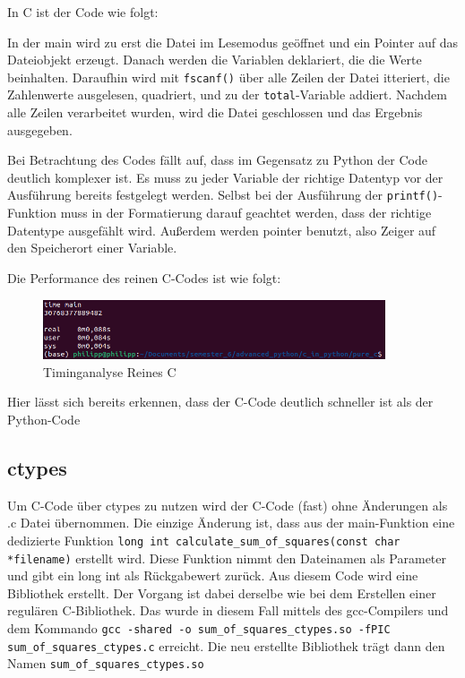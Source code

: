 \documentclass[a4paper, parskip=half]{scrartcl}
\begin{document}
In C ist der Code wie folgt:



In der main wird zu erst die Datei im Lesemodus geöffnet und ein Pointer auf das Dateiobjekt erzeugt. Danach werden die Variablen deklariert, die die Werte beinhalten. Daraufhin wird mit \lstinline{fscanf()} über alle Zeilen der Datei itteriert, die Zahlenwerte ausgelesen, quadriert, und zu der \lstinline{total}-Variable addiert. 
Nachdem alle Zeilen verarbeitet wurden, wird die Datei geschlossen und das Ergebnis ausgegeben. 

Bei Betrachtung des Codes fällt auf, dass im Gegensatz zu Python der Code deutlich komplexer ist. Es muss zu jeder Variable der richtige Datentyp vor der Ausführung bereits festgelegt werden. Selbst bei der Ausführung der \lstinline{printf()}-Funktion muss in der Formatierung darauf geachtet werden, dass der richtige Datentype ausgefählt wird. Außerdem werden pointer benutzt, also Zeiger auf den Speicherort einer Variable. 

Die Performance des reinen C-Codes ist wie folgt:
\begin{figure}[H]
    \centering
    \includegraphics[width=0.9\textwidth]{pure_c/timing_c.png}
    \caption{Timinganalyse Reines C}
    \label{fig:timing-pure-c}
\end{figure}

Hier lässt sich bereits erkennen, dass der C-Code deutlich schneller ist als der Python-Code

\subsection{ctypes}

Um C-Code über ctypes zu nutzen wird der C-Code (fast) ohne Änderungen als .c Datei übernommen. Die einzige Änderung ist, dass aus der main-Funktion eine dedizierte Funktion \lstinline{long int calculate_sum_of_squares(const char *filename)} erstellt wird. Diese Funktion nimmt den Dateinamen als Parameter und gibt ein long int als Rückgabewert zurück. 
Aus diesem Code wird eine Bibliothek erstellt. Der Vorgang ist dabei derselbe wie bei dem Erstellen einer regulären C-Bibliothek.
Das wurde in diesem Fall mittels des gcc-Compilers und dem Kommando \lstinline{gcc -shared -o sum_of_squares_ctypes.so -fPIC sum_of_squares_ctypes.c} erreicht. Die neu erstellte Bibliothek trägt dann den Namen \lstinline{sum_of_squares_ctypes.so} 
\end{document}
